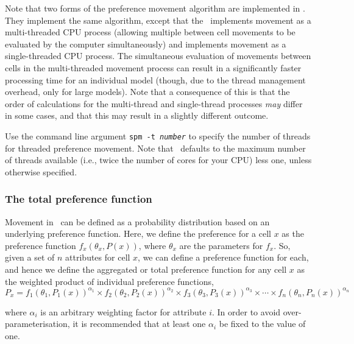 Note that two forms of the preference movement algorithm are implemented in \SPM. They implement the same algorithm, except that the \ implements movement as a multi-threaded CPU process (allowing multiple between cell movements to be evaluated by the computer simultaneously) and  implements movement as a single-threaded CPU process. The simultaneous evaluation of movements between cells in the multi-threaded movement process can result in a significantly faster processing time for an individual model (though, due to the thread management overhead, only for large models). Note that a consequence of this is that the order of calculations for the multi-thread and single-thread processes \emph{may} differ in some cases, and that this may result in a slightly different outcome.

Use the command line argument \texttt{spm -t \emph{number}} to specify the number of threads for threaded preference movement. Note that \SPM\ defaults to the maximum number of threads available (i.e., twice the number of cores for your CPU) less one, unless otherwise specified. 

\subsubsection*{The total preference function}

Movement in \SPM\ can be defined as a probability distribution based on an underlying preference function. Here, we define the preference for a cell $x$ as the preference function $f_x(\theta_x,P(x))$, where $\theta_x$ are the parameters for $f_x$. So, given a set of $n$ attributes for cell $x$, we can define a preference function for each, and hence we define the aggregated or total preference function for any cell $x$ as the weighted product of individual preference functions,
\begin{equation}
  P_x=f_1(\theta_1,P_1(x))^{\alpha_1} \times f_2(\theta_2,P_2(x))^{\alpha_2} \times f_3(\theta_3,P_3(x))^{\alpha_3} \times \cdots \times f_n(\theta_n,P_n(x))^{\alpha_n}
\end{equation}

where $\alpha_i$ is an arbitrary weighting factor for attribute $i$. In order to avoid over-parameterisation, it is recommended that at least one $\alpha_i$ be fixed to the value of one.

